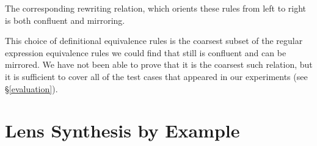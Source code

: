 \documentclass[numbers,10pt,preprint\ifanon ,nocopyrightspace\fi]{sigplanconf}
\begin{document}
The corresponding rewriting relation, which orients these rules from
left to right is both confluent and mirroring.      

This choice of definitional equivalence rules is the coarsest subset of the
regular expression equivalence rules we could find that still is confluent
and can be mirrored.  We have not been able to prove that it is the coarsest
such relation, but it is sufficient to cover all of the test cases that
appeared in our experiments (see \S\ref{evaluation}).





\section{Lens Synthesis by Example}
\label{example}
\end{document}
